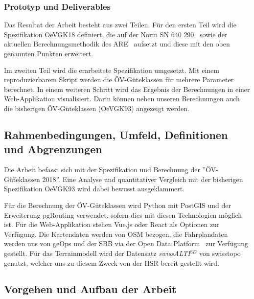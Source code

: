 \subsubsection{Prototyp und Deliverables}
\label{Ziele und Unterziele:Prototyp und Deliverables}

Das Resultat der Arbeit besteht aus zwei Teilen.
Für den ersten Teil wird die Spezifikation \gls{OeVGK18} definiert, die auf der Norm SN 640 290~\cite{sn640290} sowie der aktuellen Berechnungsmethodik des \acs{ARE}~\cite{berechnung_are} aufsetzt und diese mit den oben genannten Punkten erweitert.

Im zweiten Teil wird die erarbeitete Spezifikation umgesetzt.
Mit einem reproduzierbarem Skript werden die \acs{ÖV}-Güteklassen für mehrere Parameter berechnet.
In einem weiteren Schritt wird das Ergebnis der Berechnungen in einer Web-Applikation visualisiert.
Darin können neben unseren Berechnungen auch die bisherigen \acs{ÖV}-Güteklassen (\gls{OeVGK93}) angezeigt werden.

\subsection{Rahmenbedingungen, Umfeld, Definitionen und Abgrenzungen}
\label{Einführung:Rahmenbedingungen, Umfeld, Definitionen, Abgrenzungen}

Die Arbeit befasst sich mit der Spezifikation und Berechnung der ''ÖV-Güẗeklassen 2018''.
Eine Analyse und quantitativer Vergleich mit der bisherigen Spezifikation \gls{OeVGK93} wird dabei bewusst ausgeklammert.

Für die Berechnung der ÖV-Güteklassen wird Python mit PostGIS und der Erweiterung pgRouting verwendet, sofern dies mit diesen Technologien möglich ist.
Für die Web-Applikation stehen Vue.js oder React als Optionen zur Verfügung. Die Kartendaten werden von \ac{OSM} bezogen, die Fahrplandaten werden uns von geOps und der SBB via der Open Data Platform~\cite{sbb_open_transport_data} zur Verfügung gestellt.
Für das \gls{Terrainmodell} wird der Datensatz \emph{swissALTI$^{3D}$} von swisstopo~\cite{swissalti3d_swisstopo} genutzt, welcher uns zu diesem Zweck von der HSR bereit gestellt wird.

\subsection{Vorgehen und Aufbau der Arbeit}
\label{Einführung:Vorgehen und Aufbau der Arbeit}

